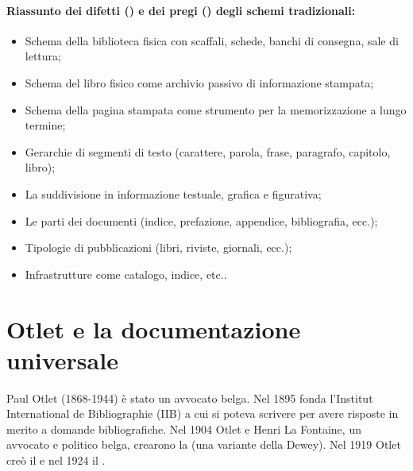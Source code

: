 \paragraph{Riassunto dei difetti (\textcolor{red}{\XSolidBrush}) e dei pregi (\textcolor{green}{\Checkmark}) degli schemi tradizionali:}

\begin{itemize}
    \item [\textcolor{red}{\XSolidBrush}] Schema della biblioteca fisica con scaffali, schede, banchi di consegna, sale di lettura;
    \item [\textcolor{red}{\XSolidBrush}] Schema del libro fisico come archivio passivo di informazione stampata;
    \item [\textcolor{red}{\XSolidBrush}] Schema della pagina stampata come strumento per la memorizzazione a lungo termine;
    \item [\textcolor{green}{\Checkmark}] Gerarchie di segmenti di testo (carattere, parola, frase, paragrafo, capitolo, libro);
    \item [\textcolor{green}{\Checkmark}] La suddivisione in informazione testuale, grafica e figurativa;
    \item [\textcolor{green}{\Checkmark}] Le parti dei documenti (indice, prefazione, appendice, bibliografia, ecc.);
    \item [\textcolor{green}{\Checkmark}] Tipologie di pubblicazioni (libri, riviste, giornali, ecc.);
    \item [\textcolor{green}{\Checkmark}] Infrastrutture come catalogo, indice, etc..
\end{itemize}


\section{Otlet e la documentazione universale}

Paul Otlet (1868-1944) è stato un avvocato belga. Nel 1895 fonda l'Institut International de Bibliographie (IIB) a cui
si poteva scrivere per avere risposte in merito a domande bibliografiche. Nel 1904 Otlet e Henri La Fontaine, 
un avvocato e politico belga, crearono la  (una variante della Dewey). Nel 1919 Otlet creò il 
e nel 1924 il .

